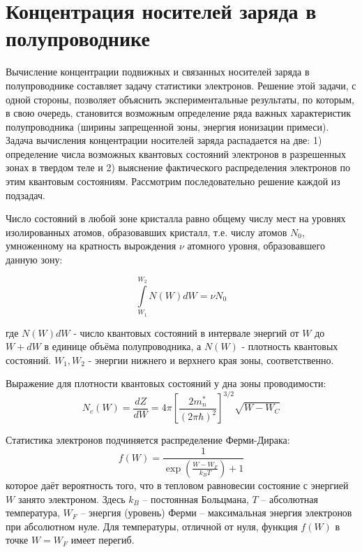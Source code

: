 \section{Концентрация носителей заряда в полупроводнике}
Вычисление концентрации подвижных и связанных носителей заряда в полупроводнике составляет задачу статистики электронов.
Решение этой задачи, с одной стороны, позволяет объяснить экспериментальные результаты, по которым, в свою очередь,
становится возможным определение ряда важных характеристик полупроводника (ширины запрещенной зоны, энергия ионизации примеси).
Задача вычисления концентрации носителей заряда распадается на две:  1) определение числа возможных квантовых состояний
электронов в разрешенных зонах в твердом теле и 2) выяснение фактического распределения электронов по этим квантовым
состояниям. Рассмотрим последовательно решение каждой из подзадач.

Число состояний в любой зоне кристалла равно общему числу мест на уровнях изолированных атомов, образовавших кристалл,
т.е. числу атомов $N_0$, умноженному на кратность вырождения $\nu$ атомного уровня, образовавшего данную зону:

\begin{equation}
	\int \limits_{W_1}^{W_2} N(W) dW  =\nu N_0 
	\label{eq:2.1}
\end{equation} 

где $N(W)dW$ - число  квантовых состояний в интервале энергий от $W$ до $W+dW$ в единице объёма полупроводника, а $N(W)$
-  плотность квантовых состояний. $W_1,W_2$ - энергии нижнего и верхнего края зоны, соответственно. 

Выражение для плотности квантовых состояний у дна зоны проводимости:
\begin{equation}
	N_{c}(W)=\frac{d Z}{d W}=4 \pi\left[\frac{2 m_{n}^{*}}{(2 \pi \hbar)^{2}}\right]^{3 / 2} \sqrt{W-W_{C}}
	\label{eq:2.7}
\end{equation} 

Статистика электронов подчиняется распределение Ферми-Дирака:   
\begin{equation}
	f(W) = \frac{1}{\exp(\frac{W-W_F}{k_B T})+1}
	\label{eq:2.8}
\end{equation}
которое даёт вероятность того, что в тепловом равновесии состояние с энергией $W$ занято электроном. Здесь $k_B$ –
постоянная Больцмана, $T$ – абсолютная температура, $W_F$ – энергия (уровень) Ферми – максимальная энергия электронов при
абсолютном нуле. Для температуры, отличной от нуля, функция $f(W)$ в точке $W = W_F$ имеет перегиб.

